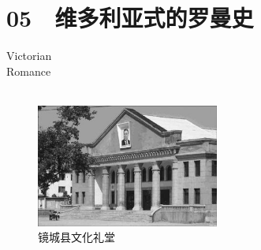 \fancyhead[RO]{{\tiny{\textcolor{Gray}{\FA \ }}}\thepage}
\fancyhead[LE]{{\tiny{\textcolor{Gray}{\FA \ }}}\thepage}
\fancyfoot[LE,RO]{}
\fancyfoot[LO,CE]{}
\fancyfoot[CO,RE]{}
\chapter*{05 {\FA } 维多利亚式的罗曼史}
\vspace{5mm}
\begin{flushright}
	\textcolor{PinYinColor}{\EN \huge{Victorian\\
		Romance\\
	\ \\}}
\end{flushright}

\begin{figure}[!htbp]
	\centering
	\includegraphics[width=6cm]{./Chapters/Images/05.jpg}
	\caption*{镜城县文化礼堂}
\end{figure}

